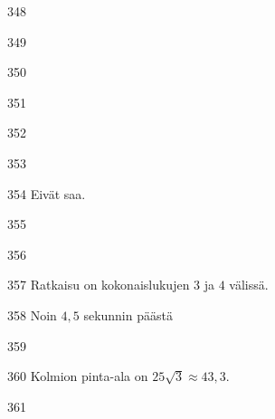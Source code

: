 \begin{Vastaus}{348}
    
\end{Vastaus}
\begin{Vastaus}{349}
  
\end{Vastaus}
\begin{Vastaus}{350}
\end{Vastaus}
\begin{Vastaus}{351}
\end{Vastaus}
\begin{Vastaus}{352}
\end{Vastaus}
\begin{Vastaus}{353}
\end{Vastaus}
\begin{Vastaus}{354}
Eivät saa.
\end{Vastaus}
\begin{Vastaus}{355}
	
\end{Vastaus}
\begin{Vastaus}{356}
	
\end{Vastaus}
\begin{Vastaus}{357}
Ratkaisu on kokonaislukujen $3$ ja $4$ välissä.
	
\end{Vastaus}
\begin{Vastaus}{358}
Noin $4,5$ sekunnin päästä
	
\end{Vastaus}
\begin{Vastaus}{359}
	
\end{Vastaus}
\begin{Vastaus}{360}
Kolmion pinta-ala on $25\sqrt{3}\approx43,3$.
\end{Vastaus}
\begin{Vastaus}{361}
\end{Vastaus}

